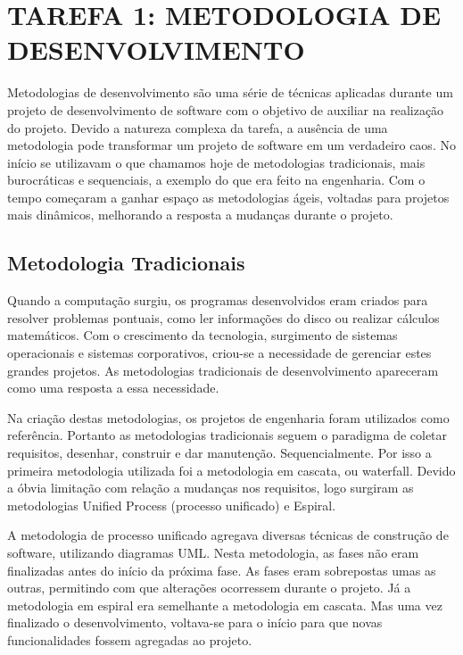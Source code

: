 
\chapter{TAREFA 1: METODOLOGIA DE DESENVOLVIMENTO}
\label{sec:tarefa1}

Metodologias de desenvolvimento são uma série de técnicas aplicadas durante um projeto de desenvolvimento de software com o objetivo de auxiliar na realização do projeto. Devido a natureza complexa da tarefa, a ausência de uma metodologia pode transformar um projeto de software em um verdadeiro caos. No início se utilizavam o que chamamos hoje de metodologias tradicionais, mais burocráticas e sequenciais, a  exemplo do que era feito na engenharia. Com o tempo começaram a ganhar espaço as metodologias ágeis, voltadas para projetos mais dinâmicos, melhorando a resposta a mudanças durante o projeto.

\section{Metodologia Tradicionais}
\label{sec:tradicional}

Quando a computação surgiu, os programas desenvolvidos eram criados para resolver problemas pontuais, como ler informações do disco ou realizar cálculos matemáticos. Com o crescimento da tecnologia, surgimento de sistemas operacionais e sistemas corporativos, criou-se a necessidade de gerenciar estes grandes projetos. As metodologias tradicionais de desenvolvimento apareceram como uma resposta a essa necessidade.

Na criação destas metodologias, os projetos de engenharia foram utilizados como referência. Portanto as metodologias tradicionais seguem o paradigma de coletar requisitos, desenhar, construir e dar manutenção. Sequencialmente. Por isso a primeira metodologia utilizada foi a metodologia em cascata, ou waterfall. Devido a óbvia limitação com relação a mudanças nos requisitos, logo surgiram as metodologias Unified Process (processo unificado) e Espiral.

A metodologia de processo unificado agregava diversas técnicas de construção de software, utilizando diagramas UML. Nesta metodologia, as fases não eram finalizadas antes do início da próxima fase. As fases eram sobrepostas umas as outras, permitindo com que alterações ocorressem durante o projeto. Já a metodologia em espiral era semelhante a metodologia em cascata. Mas uma vez finalizado o desenvolvimento, voltava-se para o início para que novas funcionalidades fossem agregadas ao projeto.

